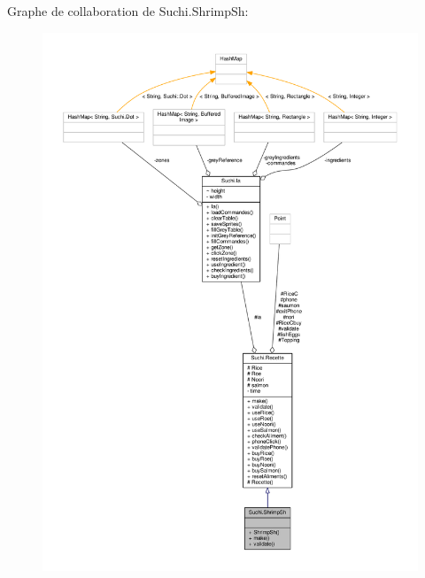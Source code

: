 Graphe de collaboration de Suchi.\+Shrimp\+Sh\+:\nopagebreak
\begin{figure}[H]
\begin{center}
\leavevmode
\includegraphics[width=350pt]{classSuchi_1_1ShrimpSh__coll__graph}
\end{center}
\end{figure}

